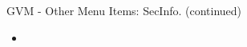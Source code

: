 \begin{frame}[t]{GVM - Other Menu Items: SecInfo. (continued)}
  \begin{itemize}
    \setlength{\itemsep}{0.12cm}
    \item {}
  \end{itemize}
\end{frame}
